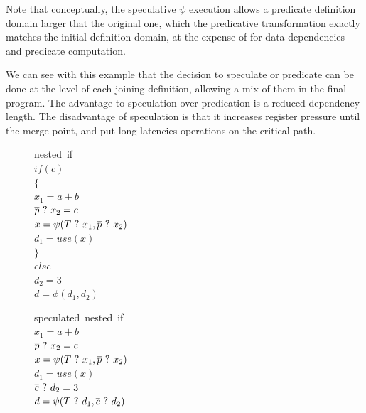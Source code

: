 Note that conceptually, the speculative $\psi$ execution allows a predicate definition domain larger that the original one, which the predicative transformation exactly matches the initial definition domain, at the expense of for data dependencies and predicate computation.

We can see with this example that the decision to speculate or predicate can be done at the level of each joining definition, allowing a mix of them in the final program. The advantage to speculation over predication is a reduced dependency length. The disadvantage of speculation is that it increases register pressure until the merge point, and put long latencies operations on the critical path.
 
\begin{figure}
\footnotesize
\begin{minipage}[b]{4cm}
\mbox{nested if} \\
$ if (c) $ \\
$ \{ $ \\
\hspace*{2mm}$ x_1 = a + b $ \\
\hspace*{2mm}$ \overline{p} ~?~ x_2 = c $ \\
\hspace*{2mm}$ x = \psi(T ~?~ x_1, \overline{p} ~?~ x_2) $ \\
\hspace*{2mm}$ d_1 = use (x) $ \\
$ \} $ \\
$ else $ \\
\hspace*{2mm}$ d_2 = 3 $ \\
$ d = \phi(d_1,d_2) $ \\
\label{fig:nested_psi}
\end{minipage}
\begin{minipage}[b]{4cm}
\mbox{speculated nested if} \\
$ x_1 = a + b $ \\
$ \overline{p} ~?~ x_2 = c $ \\
$ x = \psi(T ~?~ x_1, \overline{p} ~?~ x_2) $ \\
$ d_1 = use (x) $ \\
$ \overline{c} ~?~ d_2 = 3 $ \\
$ d = \psi(T ~?~ d_1, \overline{c} ~?~ d_2) $ \\
\label{fig:nested_psi_speculated}
\end{minipage}
\begin{minipage}[b]{4cm}

\end{minipage}
\end{figure}
